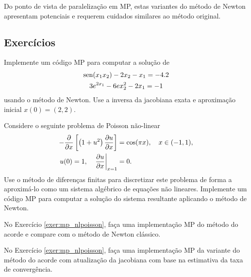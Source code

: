 Do ponto de vista de paralelização em MP, estas variantes do método de Newton apresentam potenciais e requerem  cuidados similares ao método original.

\subsection*{Exercícios}

\begin{exer}
  Implemente um código MP para computar a solução de
  \begin{gather}
    \operatorname{sen}(x_1x_2) - 2x_2 - x_1 = -4.2\\
    3e^{2x_1} - 6ex_2^2 - 2x_1 = -1
  \end{gather}
  usando o método de Newton. Use a inversa da jacobiana exata e aproximação inicial $x(0)=(2,2)$.
\end{exer}

\begin{exer}\label{exer:mp_nlpoisson}
  Considere o seguinte problema de Poisson não-linear
  \begin{align}
    -\frac{\partial}{\partial x}\left[\left(1+u^2\right)\frac{\partial u}{\partial x}\right] &= \cos(\pi x),\quad x\in (-1, 1),\\
    u(0) = 1,\quad \left.\frac{\partial u}{\partial x}\right|_{x=1} &= 0.
  \end{align}
  Use o método de diferenças finitas para discretizar este problema de forma a aproximá-lo como um sistema algébrico de equações não lineares. Implemente um código MP para computar a solução do sistema resultante aplicando o método de Newton.
\end{exer}

\begin{exer}
  No Exercício \ref{exer:mp_nlpoisson}, faça uma implementação MP do método do acorde e compare com o método de Newton clássico. 
\end{exer}

\begin{exer}
  No Exercício \ref{exer:mp_nlpoisson}, faça uma implementação MP da variante do método do acorde com atualização da jacobiana com base na estimativa da taxa de convergência.
\end{exer}

